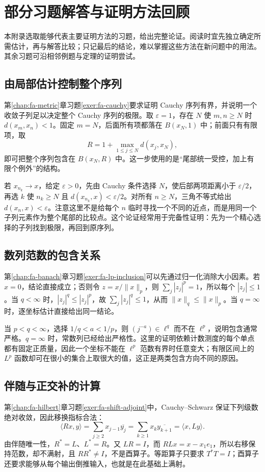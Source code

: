 \setcounter{chapter}{3} %
\chapter{部分习题解答与证明方法回顾}
\label{app:fa-solutions}

本附录选取能够代表主要证明方法的习题，给出完整论证。阅读时宜先独立确定所需估计，再与解答比较；只记最后的结论，难以掌握这些方法在新问题中的用法。其余习题可沿相邻例题与定理的证明尝试。

\section{由局部估计控制整个序列}
第\ref{chap:fa-metric}章习题\ref{exer:fa-cauchy}要求证明 Cauchy 序列有界，并说明一个收敛子列足以决定整个 Cauchy 序列的极限。取 $\varepsilon=1$，存在 $N$ 使 $m,n\geq N$ 时 $d(x_m,x_n)<1$。固定 $m=N$，后面所有项都落在 $B(x_N,1)$ 中；前面只有有限项，取
\[
 R=1+\max_{1\leq j\leq N}d(x_j,x_N),
\]
即可把整个序列包含在 $B(x_N,R)$ 中。这一步使用的是“尾部统一受控，加上有限个例外”的结构。

若 $x_{n_k}\to x$，给定 $\varepsilon>0$，先由 Cauchy 条件选择 $N$，使后部两项距离小于 $\varepsilon/2$，再选 $k$ 使 $n_k\geq N$ 且 $d(x_{n_k},x)<\varepsilon/2$。对所有 $n\geq N$，三角不等式给出 $d(x_n,x)<\varepsilon$。注意这里不是给每个 $n$ 临时寻找一个不同的近点，而是用同一个子列元素作为整个尾部的比较点。这个论证经常用于完备性证明：先为一个精心选择的子列找到极限，再回到原序列。

\section{数列范数的包含关系}
第\ref{chap:fa-banach}章习题\ref{exer:fa-lp-inclusion}可以先通过归一化消除大小因素。若 $x=0$，结论直接成立；否则令 $z=x/\|x\|_p$，则 $\sum_j|z_j|^p=1$，所以每个 $|z_j|\leq1$。当 $q<\infty$ 时，$|z_j|^q\leq|z_j|^p$，故 $\sum_j|z_j|^q\leq1$，从而 $\|x\|_q\leq\|x\|_p$。当 $q=\infty$ 时，逐坐标估计直接给出同一结论。

当 $p<q<\infty$，选择 $1/q<a<1/p$，则 $(j^{-a})\in\ell^q$ 而不在 $\ell^p$，说明包含通常严格。$q=\infty$ 时，常数列已经给出严格性。这里的证明依赖计数测度的每个单点都有固定正质量，因此一个坐标不能在 $\ell^p$ 范数有界时任意变大；有限区间上的 $L^p$ 函数却可在很小的集合上取很大的值，这正是两类包含方向不同的原因。

\section{伴随与正交补的计算}
第\ref{chap:fa-hilbert}章习题\ref{exer:fa-shift-adjoint}中，Cauchy--Schwarz 保证下列级数绝对收敛，因此移换指标合法：
\[
 \langle Rx,y\rangle=\sum_{j\geq2}x_{j-1}\overline{y_j}
 =\sum_{k\geq1}x_k\overline{y_{k+1}}=\langle x,Ly\rangle.
\]
由伴随唯一性，$R^*=L$、$L^*=R$。又 $LR=I$，而 $RLx=x-x_1e_1$，所以右移保持范数，却不满射，且 $RR^*\ne I$，不是酉算子。等距算子只要求 $T^*T=I$；酉算子还要求能够从每个输出倒推输入，也就是在此基础上满射。

